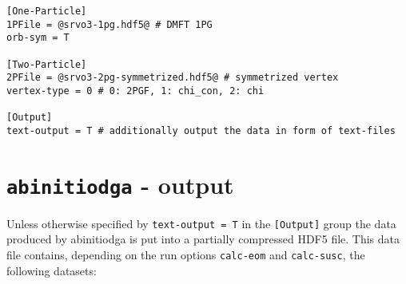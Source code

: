 \documentclass[a4paper,11pt]{article}
\numberwithin{equation}{section} %
\begin{document}
\begin{lstlisting}[caption=example abinitiodga config file, frame=single, basicstyle=\small, style=base2]
[One-Particle]                                                                                                                                                                                                 
1PFile = @srvo3-1pg.hdf5@ # DMFT 1PG                                                                                                                                                               
orb-sym = T                                                                                                                                                                                                    
                                                                                                                                                                                                               
[Two-Particle]                                                                                                                                                                                                 
2PFile = @srvo3-2pg-symmetrized.hdf5@ # symmetrized vertex                                                                                                                                                                    
vertex-type = 0 # 0: 2PGF, 1: chi_con, 2: chi                                                                                                                                                                                                                                                                                                                                                                                  
                                                                                                                                                                                                          
[Output]                                                                                                                                                                                                       
text-output = T # additionally output the data in form of text-files  
\end{lstlisting}

\newpage
\section{\protect\Verb+abinitiodga+ - output}
Unless otherwise specified by \verb|text-output = T| in the {\color{red}\verb|[Output]|} group the data produced by abinitiodga is put into a partially compressed HDF5 file. This data file contains, depending on the run options \verb|calc-eom| and \verb|calc-susc|, the following datasets:
\end{document}
